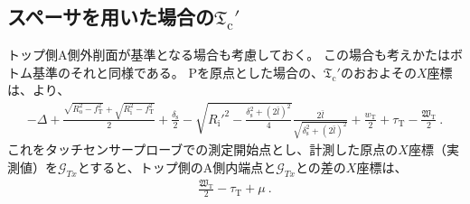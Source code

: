 \clearpage
\modHeadsection{\TopOutcutCenter}


\subsection[\index{スペーサ}スペーサを用いた場合の\texorpdfstring{$\mathfrak T_\mathrm c'$}{Tc'}]
           {スペーサを用いた場合の$\boldsymbol{\mathfrak T_\mathrm c'}$}
トップ側A側外削面が基準となる場合も考慮しておく。
この場合も考えかたはボトム基準のそれと同様である。
\TableCenter Pを原点とした場合の、\TopOutcutCenter$\mathfrak T_\mathrm c'$のおおよその$X$座標は、より、
\begin{align*}
  -\Delta+\frac{\sqrt{R_\mathrm o^2-f_\mathrm T^2}+\sqrt{R_\mathrm i^2-f_\mathrm T^2}}2+\frac{\delta_\mathrm s}2
  -\sqrt{R_\mathrm i'^2-\frac{\delta_\mathrm s^2+(2\bar l)^2}4}\frac{2\bar l}{\sqrt{\delta_\mathrm s^2+(2\bar l)^2}}
  +\frac{w_\mathrm T}2+\tau_\mathrm T-\frac{\mathfrak W_\mathrm T}2\ .
\end{align*}
これをタッチセンサープローブでの測定開始点とし、計測した原点の$X$座標（実測値）を$\mathcal G_{Tx}$とすると、トップ側のA側内端点と$\mathcal G_{Tx}$との差の$X$座標は、
\begin{align*}
  \frac{\mathfrak W_\mathrm T}2-\tau_\mathrm T+\mu~.
\end{align*}


